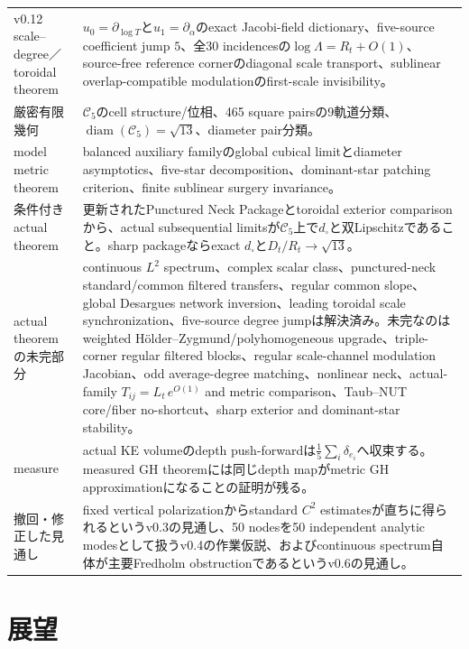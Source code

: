 \documentclass[11pt,a4paper]{ltjsarticle}
\theoremstyle{definition}
\theoremstyle{remark}
\newcommand{\diam}{\operatorname{diam}}
\begin{document}
\begin{longtable}{p{}p{}}
v0.12 scale--degree／toroidal theorem & $u_0=\partial_{\log T}$と$u_1=\partial_\alpha$のexact Jacobi-field dictionary、five-source coefficient jump $5$、全30 incidencesの$\log\Lambda=R_t+O(1)$、source-free reference cornerのdiagonal scale transport、sublinear overlap-compatible modulationのfirst-scale invisibility。\\[1mm]
厳密有限幾何 & $\mathcal C_5$のcell structure/位相、465 square pairsの9軌道分類、$\diam(\mathcal C_5)=\sqrt{13}$、diameter pair分類。\\[1mm]
model metric theorem & balanced auxiliary familyのglobal cubical limitとdiameter asymptotics、five-star decomposition、dominant-star patching criterion、finite sublinear surgery invariance。\\[1mm]
条件付きactual theorem & 更新されたPunctured Neck Packageとtoroidal exterior comparisonから、actual subsequential limitsが$\mathcal C_5$上で$d_\square$と双Lipschitzであること。sharp packageならexact $d_\square$と$D_t/R_t\to\sqrt{13}$。\\[1mm]
actual theoremの未完部分 & continuous $L^2$ spectrum、complex scalar class、punctured-neck standard/common filtered transfers、regular common slope、global Desargues network inversion、leading toroidal scale synchronization、five-source degree jumpは解決済み。未完なのはweighted Hölder--Zygmund/polyhomogeneous upgrade、triple-corner regular filtered blocks、regular scale-channel modulation Jacobian、odd average-degree matching、nonlinear neck、actual-family $T_{ij}=L_t\,e^{O(1)}$ and metric comparison、Taub--NUT core/fiber no-shortcut、sharp exterior and dominant-star stability。\\[1mm]
measure & actual KE volumeのdepth push-forwardは$\frac15\sum_i\delta_{e_i}$へ収束する。measured GH theoremには同じdepth mapがmetric GH approximationになることの証明が残る。\\[1mm]
撤回・修正した見通し & fixed vertical polarizationからstandard $C^2$ estimatesが直ちに得られるというv0.3の見通し、50 nodesを50 independent analytic modesとして扱うv0.4の作業仮説、およびcontinuous spectrum自体が主要Fredholm obstructionであるというv0.6の見通し。\\
\bottomrule
\end{longtable}

\section{展望}
\end{document}
